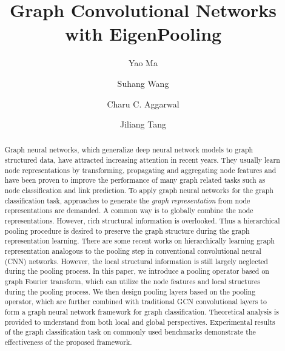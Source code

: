 \documentclass[sigconf]{acmart}
\begin{document}
\title{Graph Convolutional Networks with EigenPooling}

\author{Yao Ma}



\author{Suhang Wang}


\author{Charu C. Aggarwal}






\author{Jiliang Tang}






















\begin{abstract}
Graph neural networks, which generalize deep neural network models to graph structured data, have attracted increasing attention in recent years. They usually learn node representations by transforming, propagating and aggregating node features and have been proven to improve the performance of many graph related tasks such as node classification and link prediction. To apply graph neural networks for the graph classification task, approaches to generate the \textit{graph representation} from node representations are demanded. A common way is to globally combine the node representations. However, rich structural information is overlooked. Thus a hierarchical pooling procedure is desired to preserve the graph structure during the graph representation learning. There are some recent works on hierarchically learning graph representation analogous to the pooling step in conventional convolutional neural (CNN) networks. However, the local structural information is still largely neglected during the pooling process. In this paper, we introduce a pooling operator  based on graph Fourier transform, which can utilize the node features and local structures during the pooling process. We then design pooling layers based on the pooling operator, which are further combined with traditional GCN convolutional layers to form a graph neural network framework  for graph classification. Theoretical analysis is provided to understand  from both local and global perspectives. Experimental results of the graph classification task on  commonly used benchmarks demonstrate the effectiveness of the proposed framework. 
\end{abstract}
\end{document}
